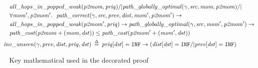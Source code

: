 \begin{figure}
\begin{equation*}
\begin{split}
&\m{all\_hops\_in\_popped\_weak}(\m{p2mom}, \m{priq}) /| \m{path\_globally\_optimal}(\gamma, \m{src}, \m{mom}, \m{p2mom}) /| \null \\
&\forall \m{mom', p2mom'}.~~\m{path\_correct}(\gamma, \m{src}, \m{prev}, \m{dist}, \m{mom'}, \m{p2mom'}) -> \\
&\m{all\_hops\_in\_popped\_weak}(\m{p2mom'}, \m{priq}) -> 
\m{path\_globally\_optimal}(\gamma, \m{src}, \m{mom'}, \m{p2mom'}) -> \\
&\m{path\_cost}(\m{p2mom} + \m{(mom, dst)}) \le \m{path\_cost}(\m{p2mom'} + \m{(mom', dst)}) \\
\vspace{1em}
&\!\!\!\!\!\!\m{inv\_unseen}(\gamma, \m{prev}, \m{dist}, \m{priq}, \m{dst}) \; \defeq \; \m{priq}[\m{dst}] = \texttt{INF} ->
(\m{dist}[\m{dst}] = \texttt{INF} /| \m{prev}[\m{dst}] = \texttt{INF})
\end{split}  
\end{equation*}
\caption{Key mathematical used in the decorated proof}
\label{fig:defns}
\end{figure}
